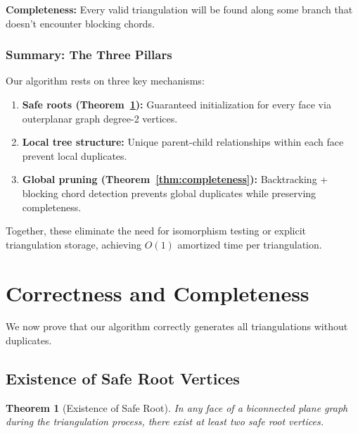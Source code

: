 \documentclass[12pt,a4paper]{article}
\newtheorem{theorem}{Theorem}
\theoremstyle{definition}
\theoremstyle{remark}
\begin{document}
\textbf{Completeness:} Every valid triangulation will be found along some branch that doesn't encounter blocking chords.

\subsubsection{Summary: The Three Pillars}

Our algorithm rests on three key mechanisms:

\begin{enumerate}
    \item \textbf{Safe roots (Theorem~\ref{thm:safe_root_exists}):} Guaranteed initialization for every face via outerplanar graph degree-2 vertices.
    
    \item \textbf{Local tree structure:} Unique parent-child relationships within each face prevent local duplicates.
    
    \item \textbf{Global pruning (Theorem~\ref{thm:completeness}):} Backtracking + blocking chord detection prevents global duplicates while preserving completeness.
\end{enumerate}

Together, these eliminate the need for isomorphism testing or explicit triangulation storage, achieving $O(1)$ amortized time per triangulation.


\section{Correctness and Completeness}
\label{sec:correctness}

We now prove that our algorithm correctly generates all triangulations without duplicates.

\subsection{Existence of Safe Root Vertices}

\begin{theorem}[Existence of Safe Root]
\label{thm:safe_root_exists}
In any face of a biconnected plane graph during the triangulation process, there exist at least two safe root vertices.
\end{theorem}
\end{document}
